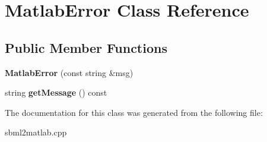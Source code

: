 \hypertarget{class_matlab_error}{\section{Matlab\-Error Class Reference}
\label{class_matlab_error}
}
\subsection*{Public Member Functions}
\begin{DoxyCompactItemize}
\item 
\hypertarget{class_matlab_error_a396e02831e37d1374920ed1055552a6e}{{\bfseries Matlab\-Error} (const string \&msg)}\label{class_matlab_error_a396e02831e37d1374920ed1055552a6e}

\item 
\hypertarget{class_matlab_error_aee171a526a0acf5601f00aae16e59aac}{string {\bfseries get\-Message} () const }\label{class_matlab_error_aee171a526a0acf5601f00aae16e59aac}

\end{DoxyCompactItemize}


The documentation for this class was generated from the following file\-:\begin{DoxyCompactItemize}
\item 
sbml2matlab.\-cpp\end{DoxyCompactItemize}
